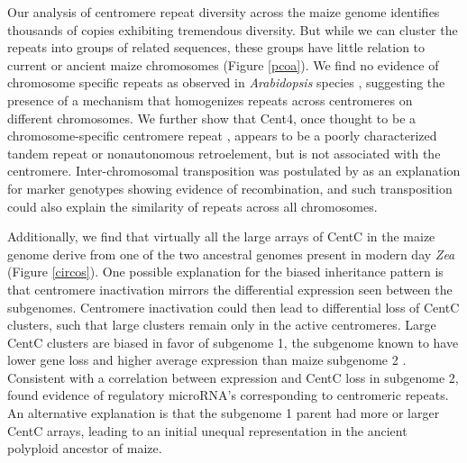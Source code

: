 
Our analysis of centromere repeat diversity across the maize genome identifies thousands of copies exhibiting tremendous diversity. 
But while we can cluster the repeats into groups of related sequences, these groups have little relation to current or ancient maize chromosomes (Figure \ref{pcoa}).  
We find no evidence of chromosome specific repeats as observed in \emph{Arabidopsis} species \citep{Kawabe2005, Pontes2004}, suggesting the presence of a mechanism that homogenizes repeats across centromeres on different chromosomes. 
We further show that Cent4, once thought to be a chromosome-specific centromere repeat \citep{Page2001}, appears to be a poorly characterized tandem repeat or nonautonomous retroelement, but is not associated with the centromere.  
Inter-chromosomal transposition was postulated by \citet{Shi2010} as an explanation for marker genotypes showing evidence of recombination, and such transposition could also explain the similarity of repeats across all chromosomes. 

Additionally, we find that virtually all the large arrays of CentC in the maize  genome derive from one of the two ancestral genomes present in modern day \emph{Zea} (Figure \ref{circos}).  
One possible explanation for the biased inheritance pattern is that centromere inactivation mirrors the differential expression seen between the subgenomes.  
Centromere inactivation could then lead to differential loss of CentC clusters, such that large clusters remain only in the active centromeres.
Large CentC clusters are biased in favor of subgenome 1, the subgenome known to have lower gene loss and higher average expression than maize subgenome 2 \citep{Schnable2011}. 
Consistent with a correlation between expression and CentC loss in subgenome 2, \citet{ReinhartBartel2002} found evidence of regulatory microRNA’s corresponding to centromeric repeats.   
An alternative explanation is that the subgenome 1 parent had more or larger CentC arrays, leading to an initial unequal representation in the ancient polyploid ancestor of maize.

